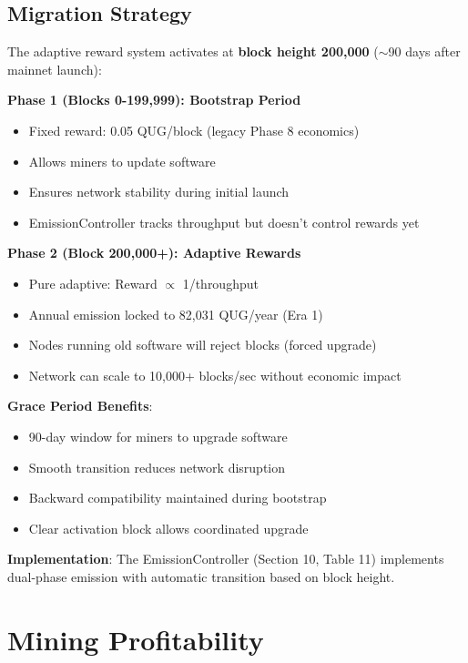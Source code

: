 \documentclass[11pt,a4paper]{article}
\begin{document}
\subsection{Migration Strategy}

\begin{tcolorbox}[colback=primarycolor!10, colframe=primarycolor, title=Phased Activation for Network Stability]
The adaptive reward system activates at \textbf{block height 200,000} ($\sim$90 days after mainnet launch):
\end{tcolorbox}

\textbf{Phase 1 (Blocks 0-199,999): Bootstrap Period}
\begin{itemize}
    \item Fixed reward: 0.05 QUG/block (legacy Phase 8 economics)
    \item Allows miners to update software
    \item Ensures network stability during initial launch
    \item EmissionController tracks throughput but doesn't control rewards yet
\end{itemize}

\textbf{Phase 2 (Block 200,000+): Adaptive Rewards}
\begin{itemize}
    \item Pure adaptive: Reward $\propto$ 1/throughput
    \item Annual emission locked to 82,031 QUG/year (Era 1)
    \item Nodes running old software will reject blocks (forced upgrade)
    \item Network can scale to 10,000+ blocks/sec without economic impact
\end{itemize}

\textbf{Grace Period Benefits}:
\begin{itemize}
    \item 90-day window for miners to upgrade software
    \item Smooth transition reduces network disruption
    \item Backward compatibility maintained during bootstrap
    \item Clear activation block allows coordinated upgrade
\end{itemize}

\textbf{Implementation}: The EmissionController (Section 10, Table 11) implements dual-phase emission with automatic transition based on block height.

\section{Mining Profitability}
\end{document}
